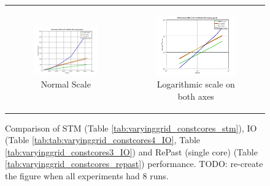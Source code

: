 \begin{figure}
\begin{center}
	\begin{tabular}{c c}
		\begin{subfigure}[b]{0.5\textwidth}
			\centering
			\includegraphics[width=1\textwidth, angle=0]{./fig/sir/stm_io_repast_varyinggrid_performance.png}
			\caption{Normal Scale}
		\end{subfigure}
    	&
		\begin{subfigure}[b]{0.5\textwidth}
			\centering
			\includegraphics[width=1\textwidth, angle=0]{./fig/sir/stm_io_repast_varyinggrid_performance_loglog.png}
			\caption{Logarithmic scale on both axes}
		\end{subfigure}
    \end{tabular}
	\caption{Comparison of STM (Table \ref{tab:varyinggrid_constcores_stm}), IO (Table \ref{tab:tab:varyinggrid_constcores4_IO}, Table 					\ref{tab:varyinggrid_constcores3_IO}) and RePast (single core) (Table \ref{tab:varyinggrid_constcores_repast}) performance. TODO: re-create the figure when all experiments had 8 runs.}
	\label{fig:stm_io_repast_varyinggrid_performance}
\end{center}
\end{figure}


